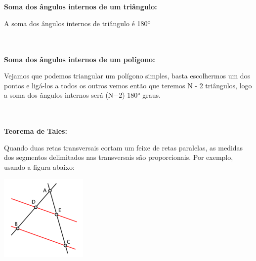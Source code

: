 \documentclass[a4paper,12pt]{article}
\begin{document}
\\~\\\noindent\textbf{Soma dos ângulos internos de um triângulo:}

\noindent A soma dos ângulos internos de triângulo é 180º

\\~\\\newline\noindent\textbf{Soma dos ângulos internos de um polígono:}

\noindent Vejamos que podemos triangular um polígono simples, basta escolhermos um dos pontos e ligá-los a todos os outros vemos então que teremos N - 2 triângulos, logo a soma dos ângulos internos será (N−2) \ang{180} graus.

\\~\\\newline\noindent\textbf{Teorema de Tales:}

\noindent Quando duas retas transversais cortam um feixe de retas paralelas, as medidas dos segmentos delimitados nas transversais são proporcionais. Por exemplo, usando a figura abaixo:

\begin{center}
  \includegraphics[width=\linewidth/4]{figures/matematica_computacional/geometria_basica/teorema_tales_1.png}
\end{center}
\end{document}
